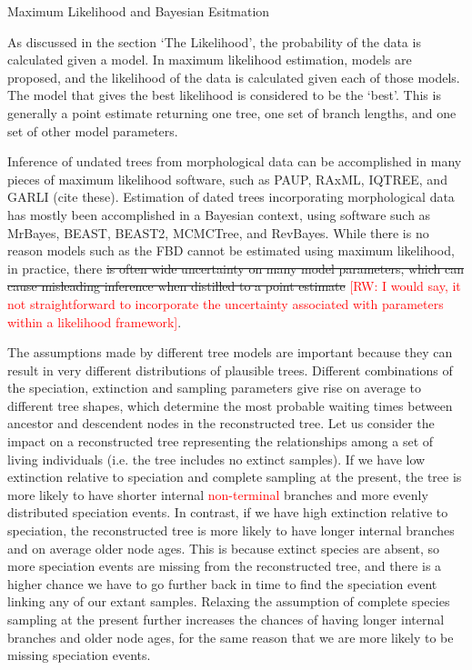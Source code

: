 \documentclass[11pt]{article}
\newcommand{\rw}[1]{{\textcolor{red}{[RW: #1]}}} %
\newcommand{\edit}[1]{{\textcolor{red}{#1}}} %
\begin{document}
\begin{boxedtext}{Maximum Likelihood and Bayesian Esitmation}

As discussed in the section `The Likelihood', the probability of the data is calculated given a model. 
In maximum likelihood estimation, models are proposed, and the likelihood of the data is calculated given each of those models.
The model that gives the best likelihood is considered to be the `best'.
This is generally a point estimate returning one tree, one set of branch lengths, and one set of other model parameters.

Inference of undated trees from morphological data can be accomplished in many pieces of maximum likelihood software, such as PAUP, RAxML, IQTREE, and GARLI (cite these).
Estimation of dated trees incorporating morphological data has mostly been accomplished in a Bayesian context, using software such as MrBayes, BEAST, BEAST2, MCMCTree, and RevBayes.
While there is no reason models such as the FBD cannot be estimated using maximum likelihood, in practice, there \sout{is often wide uncertainty on many model parameters, which can cause misleading inference when distilled to a point estimate} \rw{I would say, it not straightforward to incorporate the uncertainty associated with parameters within a likelihood framework}.
\end{boxedtext}


The assumptions made by different tree models are important because they can result in very different distributions of plausible trees.
Different combinations of the speciation, extinction and sampling parameters give rise on average to different tree shapes, which determine the most probable waiting times between ancestor and descendent nodes 
in the reconstructed tree.
Let us consider the impact on a reconstructed tree representing the relationships among a set of living individuals (i.e. the tree includes no extinct samples). 
If we have low extinction relative to speciation and complete sampling at the present, the tree is more likely to have shorter internal \edit{non-terminal} branches and more evenly distributed speciation events.
In contrast, if we have high extinction relative to speciation, the reconstructed tree is more likely to have longer internal branches and on average older node ages. 
This is because extinct species are absent, so more speciation events are missing from the reconstructed tree, and there is a higher chance we have to go further back in time to find the speciation event linking any of our extant samples.
Relaxing the assumption of complete species sampling at the present further increases the chances of having longer internal branches and older node ages, for the same reason that we are more likely to be missing speciation events.
\end{document}
